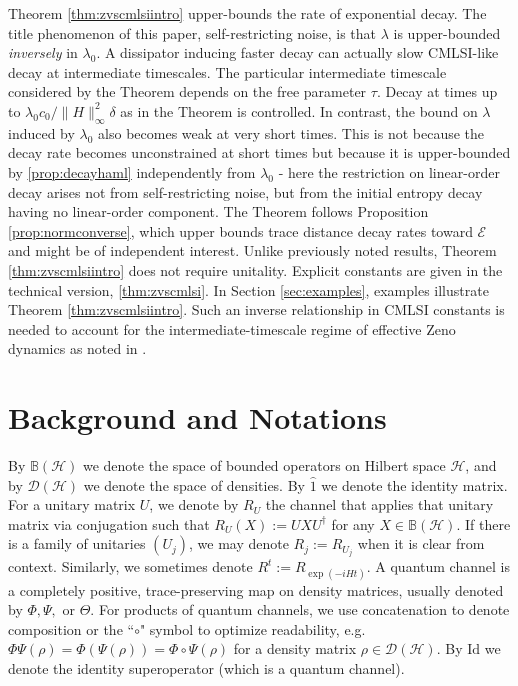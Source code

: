 \documentclass[accepted=2026-02-01, letterpaper]{quantumarticle}
\newcommand{\id}{\hat{1}}
\newcommand{\Hil}{\mathcal{H}}
\newcommand{\BB}{\mathbb{B}}
\newcommand{\E}{\mathcal{E}}
\newcommand{\D}{\mathcal{D}}
\newcommand{\Id}{\mathrm{Id}}
\newcommand{\Ha}{H}
\begin{document}
Theorem \ref{thm:zvscmlsiintro} upper-bounds the rate of exponential decay. The title phenomenon of this paper, self-restricting noise, is that $\lambda$ is upper-bounded \textit{inversely} in $\lambda_0$. A dissipator inducing faster decay can actually slow CMLSI-like decay at intermediate timescales. The particular intermediate timescale considered by the Theorem depends on the free parameter $\tau$. Decay at times up to $\lambda_0 c_0 / \| \Ha \|_{\infty}^2 \delta$ as in the Theorem is controlled. In contrast, the bound on $\lambda$ induced by $\lambda_0$ also becomes weak at very short times. This is not because the decay rate becomes unconstrained at short times but because it is upper-bounded by \ref{prop:decayhaml} independently from $\lambda_0$ - here the restriction on linear-order decay arises not from self-restricting noise, but from the initial entropy decay having no linear-order component.  %
The Theorem follows Proposition \ref{prop:normconverse}, which upper bounds trace distance decay rates toward $\E$ and might be of independent interest. Unlike previously noted results, Theorem \ref{thm:zvscmlsiintro} does not require unitality. Explicit constants are given in the technical version, \ref{thm:zvscmlsi}. In Section \ref{sec:examples}, examples illustrate Theorem \ref{thm:zvscmlsiintro}. Such an inverse relationship in CMLSI constants is needed to account for the intermediate-timescale regime of effective Zeno dynamics as noted in \cite{popkov_effective_2018}.

\section{Background and Notations} \label{sec:background}
By $\BB(\Hil)$ we denote the space of bounded operators on Hilbert space $\Hil$, and by $\D(\Hil)$ we denote the space of densities. By $\id$ we denote the identity matrix. For a unitary matrix $U$, we denote by $R_U$ the channel that applies that unitary matrix via conjugation such that $R_U(X) := U X U^\dagger$ for any $X \in \BB(\Hil)$. If there is a family of unitaries $(U_j)$, we may denote $R_j := R_{U_j}$ when it is clear from context. Similarly, we sometimes denote $R^t := R_{\exp(- i \Ha t)}$. A quantum channel is a completely positive, trace-preserving map on density matrices, usually denoted by $\Phi, \Psi,$ or $\Theta$. For products of quantum channels, we use concatenation to denote composition or the ``$\circ$" symbol to optimize readability, e.g. $\Phi \Psi (\rho) = \Phi(\Psi(\rho)) = \Phi \circ \Psi(\rho)$ for a density matrix $\rho \in \D(\Hil)$. By $\Id$ we denote the identity superoperator (which is a quantum channel).
\end{document}
